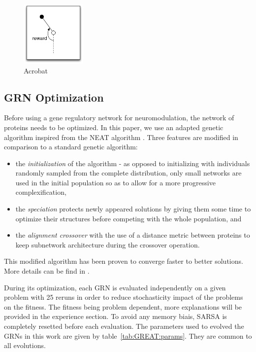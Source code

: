 \begin{figure}[ht!]
\begin{minipage}[t]{0.19\linewidth}
\center
\includegraphics[height=3.2cm]{ACP_problem.pdf}
\caption{Acrobat
}\label{fig:MC:problem}
\end{minipage}
\end{figure}

\subsection{GRN Optimization}
Before using a gene regulatory network for neuromodulation, the network of proteins needs to be optimized. In this paper, we use an adapted genetic algorithm inspired from the NEAT algorithm \cite{stanley2002evolving}. Three features are modified in comparison to a standard genetic algorithm:
\begin{itemize}
\item the \emph{initialization} of the algorithm  - as opposed to initializing with individuals randomly sampled from the complete distribution, only small networks are used in the initial population so as to allow for a more progressive complexification,
\item the \emph{speciation} protects newly appeared solutions by giving them some time to optimize their structures before competing with the whole population, and
\item the \emph{alignment crossover} with the use of a distance metric between proteins to keep subnetwork architecture during the crossover operation.
\end{itemize}
This modified algorithm has been proven to converge faster to better solutions. More details can be find in \cite{cussatblanc2015grneat}.

During its optimization, each GRN is evaluated independently on a given problem with 25 reruns in order to reduce stochasticity impact of the problems on the fitness. The fitness being problem dependent, more explanations will be provided in the experience section. To avoid any memory biais, SARSA is completely resetted before each evaluation. The parameters used to evolved the GRNs in this work are given by table~\ref{tab:GREAT:params}. They are common to all evolutions.

